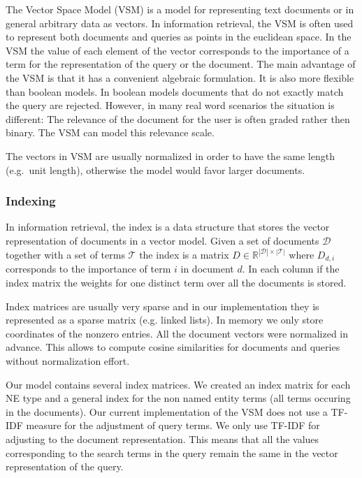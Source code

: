 The Vector Space Model (VSM) is a model for representing text documents or in general arbitrary data as vectors. In information retrieval, the VSM is often used to represent both documents and queries as points in the euclidean space. In the VSM the value of each element of the vector corresponds to the importance of a term for the representation of the query or the document. The main advantage of the VSM is that it has a convenient algebraic formulation. It is also more flexible than boolean models. In boolean models documents that do not exactly match the query are rejected. However, in many real word scenarios the situation is different: The relevance of the document for the user is often graded rather then binary. The VSM can model this relevance scale.

The vectors in VSM are usually normalized in order to have the same length (e.g.\ unit length), otherwise the model would favor larger documents.

\subsubsection{Indexing}
\label{sec:indexing}
In information retrieval, the index is a data structure that stores the vector representation of documents in a vector model. Given a set of documents $\mathcal{D}$ together with a set of terms $\mathcal{T}$ the index is a matrix $D \in \mathbb{R}^{|\mathcal{D}|\times |\mathcal{T}|}$ where $D_{d,i}$ corresponds to the importance of term $i$ in document $d$. In each column if the index matrix the weights for one distinct term over all the documents is stored. 

Index matrices are usually very sparse and in our implementation they is represented as a sparse matrix (e.g. linked lists). In memory we only store coordinates of the nonzero entries. All the document vectors were normalized in advance. This allows to compute cosine similarities for documents and queries without normalization effort.

Our model contains several index matrices. We created an index matrix for each NE type and a general index for the non named entity terms (all terms occuring in the documents). Our current implementation of the VSM does not use a TF-IDF measure for the adjustment of query terms. We only use TF-IDF for adjusting to the document representation. This means that all the values corresponding to the search terms in the query remain the same in the vector representation of the query.

